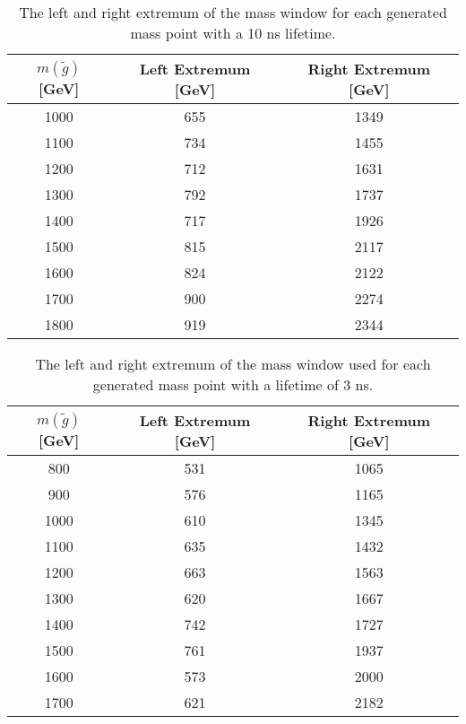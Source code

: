 \begin{table}[!htbp]
  \begin{center}
    \begin{tabular}{ccc}
        \hline
        $m(\tilde{g})$ [GeV]  & Left Extremum [GeV] & Right Extremum [GeV] \\
        \hline
        1000    & 655 & 1349 \\
        1100    & 734 & 1455 \\
        1200    & 712 & 1631 \\
        1300    & 792 & 1737 \\
        1400    & 717 & 1926 \\
        1500    & 815 & 2117 \\
        1600    & 824 & 2122 \\
        1700    & 900 & 2274 \\
        1800    & 919 & 2344 \\
        \hline
    \end{tabular}
  \end{center}
  \caption{The left and right extremum of the mass window for each generated mass point with a 10 ns lifetime.}
  \label{tab:app_window_10ns}
\end{table}

\begin{table}[!htbp]
  \begin{center}
    \begin{tabular}{ccc}
        \hline
        $m(\tilde{g})$ [GeV]  & Left Extremum [GeV] & Right Extremum [GeV] \\
        \hline
        800    & 531 & 1065 \\
        900    & 576 & 1165 \\
        1000    & 610 & 1345 \\
        1100    & 635 & 1432 \\
        1200    & 663 & 1563 \\
        1300    & 620 & 1667 \\
        1400    & 742 & 1727 \\
        1500    & 761 & 1937 \\
        1600    & 573 & 2000 \\
        1700    & 621 & 2182 \\
        \hline
    \end{tabular}
  \end{center}
  \caption{The left and right extremum of the mass window used for each generated mass point with a lifetime of 3 ns.}
  \label{tab:app_window_3ns}
\end{table}


